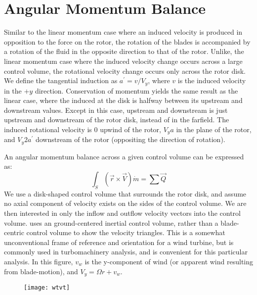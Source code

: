 %
%




\section{Angular Momentum Balance}

Similar to the linear momentum case where an induced velocity is produced in opposition to the force on the rotor, the rotation of the blades is accompanied by a rotation of the fluid in the opposite direction to that of the rotor.  Unlike, the linear momentum case where the induced velocity change occurs across a large control volume, the rotational velocity change occurs only across the rotor disk. We define the tangential induction as $a^\prime = v/V_y$, where $v$ is the induced velocity in the $+y$ direction.  Conservation of momentum yields the same result as the linear case, where the induced at the disk is halfway between its upstream and downstream values.  Except in this case, upstream and downstream is just upstream and downstream of the rotor disk, instead of in the farfield.  The induced rotational velocity is 0 upwind of the rotor, $V_y a$ in the plane of the rotor, and $V_y 2 a^\prime$ downstream of the rotor (oppositing the direction of rotation).

An angular momentum balance across a given control volume can be expressed as:
\begin{equation}
    \int_S \left(\vec{r} \times \vec{V}\right) \dot{m} = \sum \vec{Q}
\end{equation}
We use a disk-shaped control volume that surrounds the rotor disk, and assume no axial component of velocity exists on the sides of the control volume.  We are then interested in only the inflow and outflow velocity vectors into the control volume.  uses an ground-centered inertial control volume, rather than a blade-centric control volume to show the velocity triangles.  This is a somewhat unconventional frame of reference and orientation for a wind turbine, but is commonly used in turbomachinery analysis, and is convenient for this particular analysis.  In this figure, $v_w$ is the y-component of wind (or apparent wind resulting from blade-motion), and $V_y = \Omega r + v_w$.
\begin{figure}[htbp]
\centering
\texttt{[image: wtvt]}
\caption{}
\label{fig:wtvt}
\end{figure}


